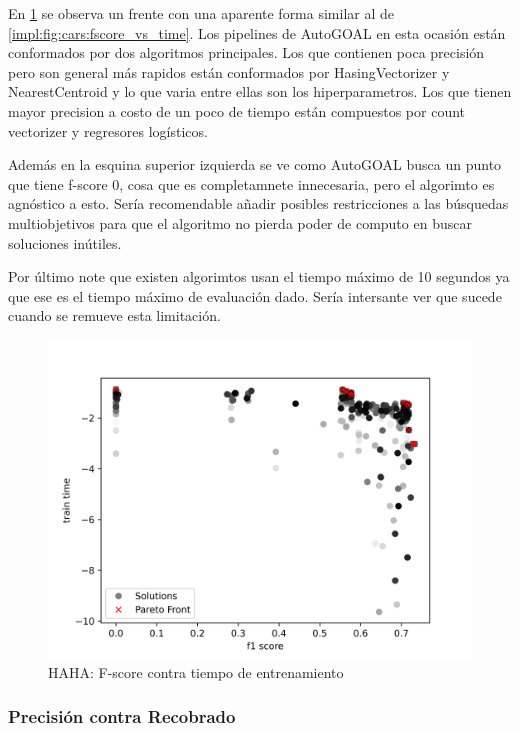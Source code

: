 En \ref{impl:fig:haha:fscore_vs_time} se observa un frente con una aparente forma similar al de \ref{impl:fig:cars:fscore_vs_time}. Los pipelines de AutoGOAL en esta ocasi\'on est\'an conformados por dos algoritmos principales. Los que contienen poca precisi\'on pero son general m\'as rapidos est\'an conformados por HasingVectorizer y NearestCentroid y  lo que varia entre ellas son los hiperparametros. Los que tienen mayor precision a costo de un poco de tiempo est\'an compuestos por count vectorizer  y regresores log\'isticos.

Adem\'as en la esquina superior izquierda se ve como AutoGOAL busca un punto que tiene f-score 0, cosa que es completamnete innecesaria, pero el algorimto es agn\'ostico a esto. Ser\'ia recomendable añadir posibles restricciones a las b\'usquedas multiobjetivos para que el algoritmo no pierda poder de computo en buscar soluciones in\'utiles.

Por \'ultimo note que existen algorimtos usan el tiempo m\'aximo de 10 segundos ya que ese es el tiempo m\'aximo de evaluaci\'on dado. Ser\'ia intersante ver que sucede cuando se remueve esta limitaci\'on.

\begin{figure}[ht]
    \centering
    \includegraphics[scale=0.8]{Pictures/haha_fscore_vs_time.jpg}
    \caption{HAHA: F-score contra tiempo de entrenamiento}
    \label{impl:fig:haha:fscore_vs_time}
\end{figure}
\subsubsection{Precisi\'on contra Recobrado}

